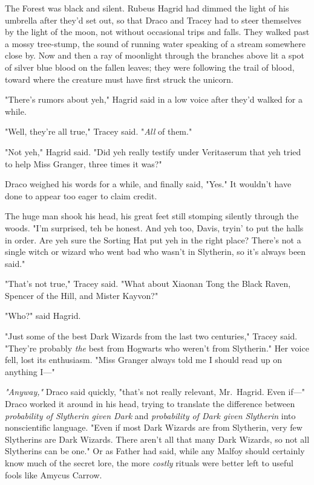 The Forest was black and silent. Rubeus Hagrid had dimmed the light of his
umbrella after they'd set out, so that Draco and Tracey had to steer themselves
by the light of the moon, not without occasional trips and falls. They walked
past a mossy tree-stump, the sound of running water speaking of a stream
somewhere close by. Now and then a ray of moonlight through the branches above
lit a spot of silver blue blood on the fallen leaves; they were following the
trail of blood, toward where the creature must have first struck the unicorn.

"There's rumors about yeh," Hagrid said in a low voice after they'd walked for
a while.

"Well, they're all true," Tracey said. "\emph{All} of them."

"Not yeh," Hagrid said. "Did yeh really testify under Veritaserum that yeh
tried to help Miss Granger, three times it was?"

Draco weighed his words for a while, and finally said, "Yes." It wouldn't have
done to appear too eager to claim credit.

The huge man shook his head, his great feet still stomping silently through the
woods. "I'm surprised, teh be honest. And yeh too, Davis, tryin' to put the
halls in order. Are yeh sure the Sorting Hat put yeh in the right place?
There's not a single witch or wizard who went bad who wasn't in Slytherin, so
it's always been said."

"That's not true," Tracey said. "What about Xiaonan Tong the Black Raven,
Spencer of the Hill, and Mister Kayvon?"

"Who?" said Hagrid.

"Just some of the best Dark Wizards from the last two centuries," Tracey said.
"They're probably \emph{the} best from Hogwarts who weren't from Slytherin."
Her voice fell, lost its enthusiasm. "Miss Granger always told me I should read
up on anything I\mbox{---}"

\emph{"Anyway,"} Draco said quickly, "that's not really relevant, Mr.~Hagrid.
Even if\mbox{---}" Draco worked it around in his head, trying to translate the
difference between \emph{probability of Slytherin given Dark} and
\emph{probability of Dark given Slytherin} into nonscientific language. "Even
if most Dark Wizards are from Slytherin, very few Slytherins are Dark Wizards.
There aren't all that many Dark Wizards, so not all Slytherins can be one." Or
as Father had said, while any Malfoy should certainly know much of the secret
lore, the more{\el} \emph{costly} rituals were better left to useful fools
like Amycus Carrow.

